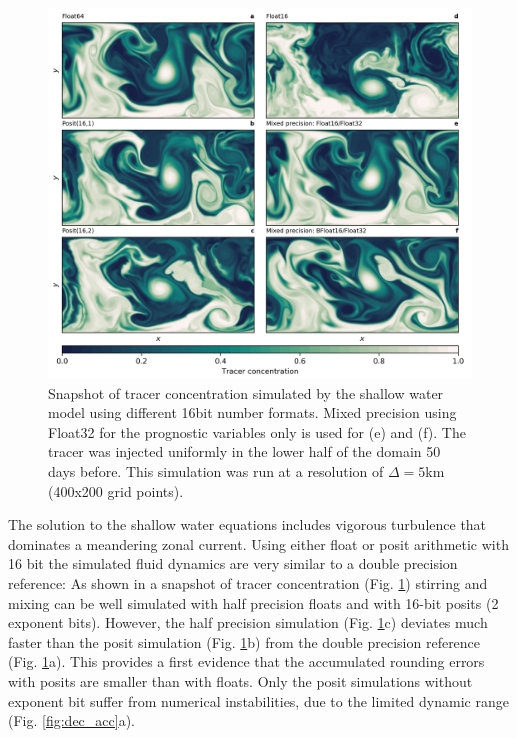 \documentclass[draft]{agujournal2019}
\begin{document}
\begin{figure}
\includegraphics[width=1\textwidth]{../plots/snapshot.png}
\caption{Snapshot of tracer concentration simulated by the shallow water model using different 16bit number formats. Mixed precision using Float32 for the prognostic variables only is used for (e) and (f). The tracer was injected uniformly in the lower half of the domain 50 days before. This simulation was run at a resolution of $\Delta = 5$km (400x200 grid points).}
\label{fig:snapshot}
\end{figure}

The solution to the shallow water equations includes vigorous turbulence that dominates a meandering zonal current. Using either float or posit arithmetic with 16 bit the simulated fluid dynamics are very similar to a double precision reference: As shown in a snapshot of tracer concentration (Fig. \ref{fig:snapshot}) stirring and mixing can be well simulated with half precision floats and with 16-bit posits (2 exponent bits). However, the half precision simulation (Fig. \ref{fig:snapshot}c) deviates much faster than the posit simulation (Fig. \ref{fig:snapshot}b) from the double precision reference (Fig. \ref{fig:snapshot}a). This provides a first evidence that the accumulated rounding errors with posits are smaller than with floats. Only the posit simulations without exponent bit suffer from numerical instabilities, due to the limited dynamic range (Fig. \ref{fig:dec_acc}a). 
\end{document}
